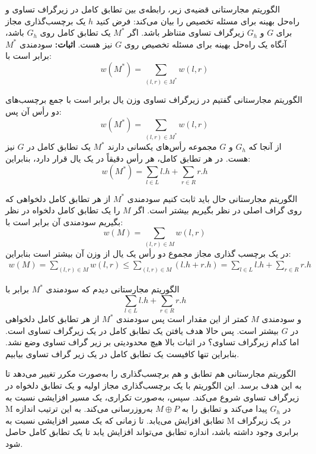 \begin{itemframe}{الگوریتم مجارستانی}
\itm
قضیه‌ی زیر، رابطه‌ی بین تطابق کامل در زیرگراف تساوی و راه‌حل بهینه برای مسئله تخصیص را بیان می‌کند:
\itm
فرض کنید $h$ یک برچسب‌گذاری مجاز برای $G$ و $G_h$ زیرگراف تساوی متناظر باشد. اگر $M^*$ یک تطابق کامل روی $G_h$ باشد، آنگاه یک راه‌حل بهینه برای مسئله تخصیص روی $G$ نیز هست.
\itm
\textbf{اثبات:}
سودمندی $M^*$ برابر است با:
$$
w(M^\ast) = \sum_{(l, r) \in M^\ast} w(l, r)
$$

\end{itemframe}


\begin{itemframe}{الگوریتم مجارستانی}
\itm
گفتیم در زیرگراف تساوی وزن یال برابر است با جمع برچسب‌های دو رأس آن پس:
$$
w(M^\ast) = \sum_{(l, r) \in M^\ast} w(l, r)
$$
\itm
از آنجا که $G_h$ و $G$ مجموعه رأس‌های یکسانی دارند $M^\ast$ یک تطابق کامل در $G$ نیز هست. در هر تطابق کامل، هر رأس دقیقاً در یک یال قرار دارد، بنابراین:
$$
w(M^\ast) = \sum_{l \in L} l.h + \sum_{r \in R} r.h
$$
\end{itemframe}


\begin{itemframe}{الگوریتم مجارستانی}
\itm
حال باید ثابت کنیم سودمندی $M^\ast$ از هر تطابق کامل دلخواهی که روی گراف اصلی در نظر بگیریم بیشتر است. اگر $M$  را یک تطابق کامل دلخواه در نظر بگیریم سودمندی آن برابر است با:
$$
w(M) = \sum_{(l, r) \in M} w(l, r)
$$
\itm
در یک برچسب گذاری مجاز مجموع دو رأس یک یال از وزن آن بیشتر است بنابراین:
\begin{align*}
w(M) = \sum_{(l, r) \in M} w(l, r) \leq \sum_{(l, r) \in M} (l.h + r.h) = \sum_{l \in L} l.h + \sum_{r \in R} r.h
\end{align*}
\end{itemframe}


\begin{itemframe}{الگوریتم مجارستانی}
\itm
دیدم که سودمندی $M^\ast$ برابر با
$$
\sum_{l \in L} l.h + \sum_{r \in R} r.h
$$
و سودمندی $M$ کمتر از این مقدار است پس سودمندی $M^\ast$ از هر تطابق کامل دلخواهی در $G‌$ بیشتر است.
\itm
پس حالا هدف یافتن یک تطابق کامل در یک زیرگراف تساوی است. اما کدام زیرگراف تساوی؟ در اثبات بالا هیچ محدودیتی بر زیر گراف تساوی وضع نشد. بنابراین تنها کافیست یک تطابق کامل در یک زیر گراف تساوی بیابیم.

\itm
الگوریتم مجارستانی هم تطابق و هم برچسب‌گذاری را به‌صورت مکرر تغییر می‌دهد تا به این هدف برسد.
\itm
این الگوریتم با یک برچسب‌گذاری مجاز اولیه و یک تطابق دلخواه در زیرگراف تساوی شروع می‌کند. سپس، به‌صورت تکراری، یک مسیر افزایشی نسبت به  M در $G_h$ پیدا می‌کند و تطابق را به $M \oplus P$ به‌روزرسانی می‌کند. به این ترتیب اندازه تطابق افزایش می‌یابد.
\itm
تا زمانی که یک مسیر افزایشی نسبت به M در یک زیرگراف برابری وجود داشته باشد، اندازه تطابق می‌تواند افزایش یابد تا یک تطابق کامل حاصل شود.
\end{itemframe}



